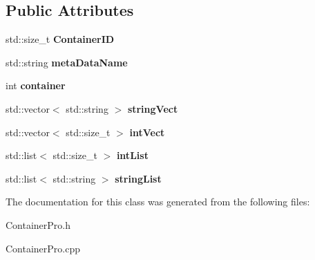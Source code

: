 \subsection*{Public Attributes}
\begin{DoxyCompactItemize}
\item 
\hypertarget{class_container_pro_aeab253c965e28d2861047d9f202157d2}{}std\+::size\+\_\+t {\bfseries Container\+I\+D}\label{class_container_pro_aeab253c965e28d2861047d9f202157d2}

\item 
\hypertarget{class_container_pro_adcee4acc23a8bddde40f3e4007cef2d3}{}std\+::string {\bfseries meta\+Data\+Name}\label{class_container_pro_adcee4acc23a8bddde40f3e4007cef2d3}

\item 
\hypertarget{class_container_pro_a830e2f6b824f88752ec7f5e43b08c144}{}int {\bfseries container}\label{class_container_pro_a830e2f6b824f88752ec7f5e43b08c144}

\item 
\hypertarget{class_container_pro_ad6e198b1301e6e00ec19ef379282d3cd}{}std\+::vector$<$ std\+::string $>$ {\bfseries string\+Vect}\label{class_container_pro_ad6e198b1301e6e00ec19ef379282d3cd}

\item 
\hypertarget{class_container_pro_ac1cda7bbdd2f6b51d2262697597cf065}{}std\+::vector$<$ std\+::size\+\_\+t $>$ {\bfseries int\+Vect}\label{class_container_pro_ac1cda7bbdd2f6b51d2262697597cf065}

\item 
\hypertarget{class_container_pro_a0b039ff628df11dc7e73825b047cc67f}{}std\+::list$<$ std\+::size\+\_\+t $>$ {\bfseries int\+List}\label{class_container_pro_a0b039ff628df11dc7e73825b047cc67f}

\item 
\hypertarget{class_container_pro_a3c1812b3a3696c5ce0cd9412df94eba4}{}std\+::list$<$ std\+::string $>$ {\bfseries string\+List}\label{class_container_pro_a3c1812b3a3696c5ce0cd9412df94eba4}

\end{DoxyCompactItemize}


The documentation for this class was generated from the following files\+:\begin{DoxyCompactItemize}
\item 
Container\+Pro.\+h\item 
Container\+Pro.\+cpp\end{DoxyCompactItemize}
